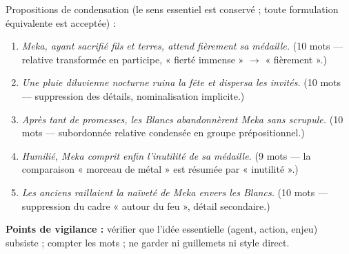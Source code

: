 \documentclass[11pt]{article}
\begin{document}
\begin{corrige}
Propositions de condensation (le sens essentiel est conservé ; toute formulation équivalente est acceptée) :
\begin{enumerate}
\item \textit{Meka, ayant sacrifié fils et terres, attend fièrement sa médaille.} (10 mots --- relative transformée en participe, « fierté immense » $\rightarrow$ « fièrement ».)
\item \textit{Une pluie diluvienne nocturne ruina la fête et dispersa les invités.} (10 mots --- suppression des détails, nominalisation implicite.)
\item \textit{Après tant de promesses, les Blancs abandonnèrent Meka sans scrupule.} (10 mots --- subordonnée relative condensée en groupe prépositionnel.)
\item \textit{Humilié, Meka comprit enfin l'inutilité de sa médaille.} (9 mots --- la comparaison « morceau de métal » est résumée par « inutilité ».)
\item \textit{Les anciens raillaient la naïveté de Meka envers les Blancs.} (10 mots --- suppression du cadre « autour du feu », détail secondaire.)
\end{enumerate}
\textbf{Points de vigilance :} vérifier que l'idée essentielle (agent, action, enjeu) subsiste ; compter les mots ; ne garder ni guillemets ni style direct.
\end{corrige}
\end{document}
